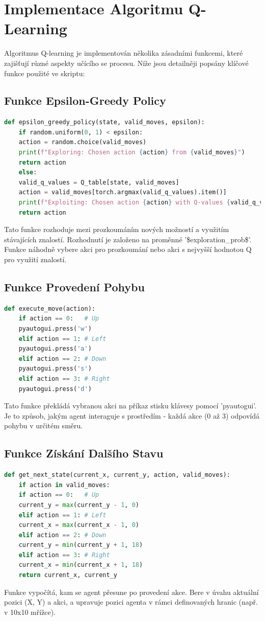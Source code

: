 \documentclass[12pt, a4paper,
twoside,        %
openright
]{report}
\begin{document}
\section{Implementace Algoritmu Q-Learning}

Algoritmus Q-learning je implementován několika zásadními funkcemi, které zajišťují různé aspekty učícího se procesu. Níže jsou detailněji popsány klíčové funkce použité ve skriptu:

\subsection{Funkce Epsilon-Greedy Policy}
\begin{lstlisting}[language=Python]
	def epsilon_greedy_policy(state, valid_moves, epsilon):
	if random.uniform(0, 1) < epsilon:
	action = random.choice(valid_moves)
	print(f"Exploring: Chosen action {action} from {valid_moves}")
	return action
	else:
	valid_q_values = Q_table[state, valid_moves]
	action = valid_moves[torch.argmax(valid_q_values).item()]
	print(f"Exploiting: Chosen action {action} with Q-values {valid_q_values}")
	return action
\end{lstlisting}
Tato funkce rozhoduje mezi prozkoumáním nových možností a využitím stávajících znalostí. Rozhodnutí je založeno na proměnné '\$exploration\_prob\$'. Funkce náhodně vybere akci pro prozkoumání nebo akci s nejvyšší hodnotou Q pro využití znalostí.

\newpage
\subsection{Funkce Provedení Pohybu}
\begin{lstlisting}[language=Python]
	def execute_move(action):
	if action == 0:   # Up
	pyautogui.press('w')
	elif action == 1: # Left
	pyautogui.press('a')
	elif action == 2: # Down
	pyautogui.press('s')
	elif action == 3: # Right
	pyautogui.press('d')
\end{lstlisting}
Tato funkce překládá vybranou akci na příkaz stisku klávesy pomocí 'pyautogui'. Je to způsob, jakým agent interaguje s prostředím - každá akce (0 až 3) odpovídá pohybu v určitém směru.

\subsection{Funkce Získání Dalšího Stavu}
\begin{lstlisting}[language=Python]
	def get_next_state(current_x, current_y, action, valid_moves):
	if action in valid_moves:
	if action == 0:   # Up
	current_y = max(current_y - 1, 0)
	elif action == 1: # Left
	current_x = max(current_x - 1, 0)
	elif action == 2: # Down
	current_y = min(current_y + 1, 18)
	elif action == 3: # Right
	current_x = min(current_x + 1, 18)
	return current_x, current_y
\end{lstlisting}
Funkce vypočítá, kam se agent přesune po provedení akce. Bere v úvahu aktuální pozici (X, Y) a akci, a upravuje pozici agenta v rámci definovaných hranic (např. v 10x10 mřížce).
\end{document}
